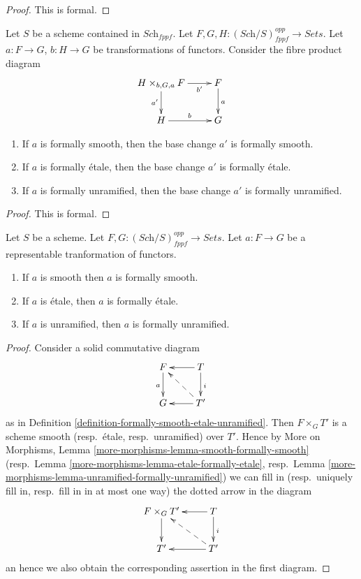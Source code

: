 \begin{proof}
This is formal.
\end{proof}

\begin{lemma}
\label{lemma-base-change-formally-smooth-etale-unramified}
Let $S$ be a scheme contained in $\textit{Sch}_{fppf}$.
Let $F, G, H : (\textit{Sch}/S)_{fppf}^{opp} \to \textit{Sets}$.
Let $a : F \to G$, $b : H \to G$ be transformations of functors.
Consider the fibre product diagram
$$
\xymatrix{
H \times_{b, G, a} F \ar[r]_-{b'} \ar[d]_{a'} & F \ar[d]^a \\
H \ar[r]^b & G
}
$$
\begin{enumerate}
\item If $a$ is formally smooth, then the base change $a'$ is
formally smooth.
\item If $a$ is formally \'etale, then the base change $a'$ is
formally \'etale.
\item If $a$ is formally unramified, then the base change $a'$ is
formally unramified.
\end{enumerate}
\end{lemma}

\begin{proof}
This is formal.
\end{proof}

\begin{lemma}
\label{lemma-representable-property-formally-property}
Let $S$ be a scheme.
Let $F, G : (\textit{Sch}/S)_{fppf}^{opp} \to \textit{Sets}$.
Let $a : F \to G$ be a representable tranformation of functors.
\begin{enumerate}
\item If $a$ is smooth then $a$ is formally smooth.
\item If $a$ is \'etale, then $a$ is formally \'etale.
\item If $a$ is unramified, then $a$ is formally unramified.
\end{enumerate}
\end{lemma}

\begin{proof}
Consider a solid commutative diagram
$$
\xymatrix{
F \ar[d]_a & T \ar[d]^i \ar[l] \\
G & T' \ar[l] \ar@{-->}[lu]
}
$$
as in
Definition \ref{definition-formally-smooth-etale-unramified}.
Then $F \times_G T'$ is a scheme smooth (resp.\ \'etale, resp.\ unramified)
over $T'$. Hence by
More on Morphisms, Lemma \ref{more-morphisms-lemma-smooth-formally-smooth}
(resp.\ Lemma \ref{more-morphisms-lemma-etale-formally-etale}, 
resp.\ Lemma \ref{more-morphisms-lemma-unramified-formally-unramified})
we can fill in (resp.\ uniquely fill in, resp.\ fill in in at most
one way) the dotted arrow in the diagram
$$
\xymatrix{
F \times_G T' \ar[d] & T \ar[d]^i \ar[l] \\
T' & T' \ar[l] \ar@{-->}[lu]
}
$$
an hence we also obtain the corresponding assertion in the first diagram.
\end{proof}

